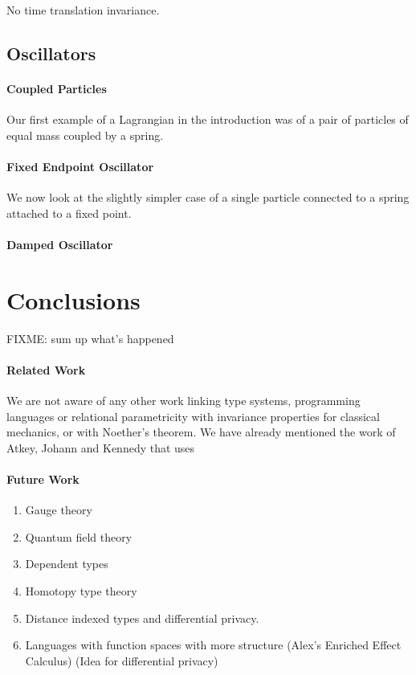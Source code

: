 \documentclass[preprint]{sigplanconf}
\theoremstyle{examplestyle}
\begin{document}
No time translation invariance.

\subsection{Oscillators}

\paragraph{Coupled Particles} Our first example of a Lagrangian in the
introduction was of a pair of particles of equal mass coupled by a
spring.

\paragraph{Fixed Endpoint Oscillator} We now look at the slightly
simpler case of a single particle connected to a spring attached to a
fixed point.

\paragraph{Damped Oscillator}

\section{Conclusions}
\label{sec:conclusions}

FIXME: sum up what's happened

\paragraph{Related Work} We are not aware of any other work linking
type systems, programming languages or relational parametricity with
invariance properties for classical mechanics, or with Noether's
theorem. We have already mentioned the work of Atkey, Johann and
Kennedy \cite{atkey13abstraction} that uses 

\paragraph{Future Work}

\begin{enumerate}
\item Gauge theory
\item Quantum field theory
\item Dependent types
\item Homotopy type theory
\item Distance indexed types and differential privacy.
\item Languages with function spaces with more structure (Alex's
  Enriched Effect Calculus) (Idea for differential privacy)
\end{enumerate}
\end{document}
